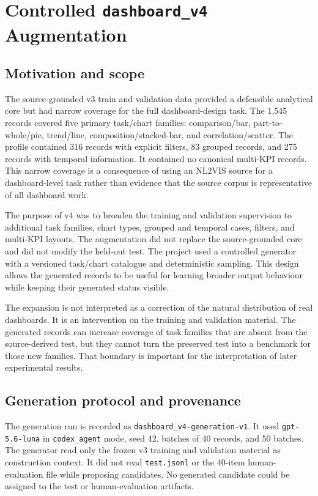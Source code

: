 \section{\texorpdfstring{Controlled \texttt{dashboard\_v4} Augmentation}{Controlled dashboard\_v4 Augmentation}}

\subsection{Motivation and scope}

The source-grounded v3 train and validation data provided a defensible analytical core but had narrow coverage for the full dashboard-design task. The 1,545 records covered five primary task/chart families: comparison/bar, part-to-whole/pie, trend/line, composition/stacked-bar, and correlation/scatter. The profile contained 316 records with explicit filters, 83 grouped records, and 275 records with temporal information. It contained no canonical multi-KPI records. This narrow coverage is a consequence of using an NL2VIS source for a dashboard-level task rather than evidence that the source corpus is representative of all dashboard work.

The purpose of v4 was to broaden the training and validation supervision to additional task families, chart types, grouped and temporal cases, filters, and multi-KPI layouts. The augmentation did not replace the source-grounded core and did not modify the held-out test. The project used a controlled generator with a versioned task/chart catalogue and deterministic sampling. This design allows the generated records to be useful for learning broader output behaviour while keeping their generated status visible.

The expansion is not interpreted as a correction of the natural distribution of real dashboards. It is an intervention on the training and validation material. The generated records can increase coverage of task families that are absent from the source-derived test, but they cannot turn the preserved test into a benchmark for those new families. That boundary is important for the interpretation of later experimental results.

\subsection{Generation protocol and provenance}

The generation run is recorded as \nolinkurl{dashboard_v4-generation-v1}. It used \texttt{gpt-5.6-luna} in \texttt{codex\_agent} mode, seed 42, batches of 40 records, and 50 batches. The generator read only the frozen v3 training and validation material as construction context. It did not read \texttt{test.jsonl} or the 40-item human-evaluation file while proposing candidates. No generated candidate could be assigned to the test or human-evaluation artifacts.

